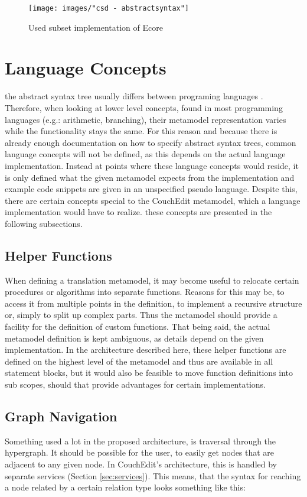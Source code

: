 \begin{figure}
\centering
\texttt{[image: images/"csd - abstractsyntax"]}
\caption{Used subset implementation of Ecore}
\label{fig:csd-abstractsyntax}
\end{figure}


\section{Language Concepts}
the abstract syntax tree usually differs between programing languages . Therefore, when looking at lower level concepts, found in most programming languages (e.g.: arithmetic, branching), their metamodel representation varies while the functionality stays the same. For this reason and because there is already enough documentation on how to specify abstract syntax trees, common language concepts will not be defined, as this depends on the actual language implementation. Instead at points where these language concepts would reside, it is only defined what the given metamodel expects from the implementation and example code snippets are given in an unspecified pseudo language. Despite this, there are certain concepts special to the CouchEdit metamodel, which a language implementation would have to realize. these concepts are presented in the following subsections.


\subsection{Helper Functions}
When defining a translation metamodel, it may become useful to relocate certain procedures or algorithms into separate functions. Reasons for this may be, to access it from multiple points in the definition, to implement a recursive structure or, simply to split up complex parts. Thus the metamodel should provide a facility for the definition of custom functions. That being said, the actual metamodel definition is kept ambiguous, as details depend on the given implementation. In the architecture described here, these helper functions are defined on the highest level of the metamodel and thus are available in all statement blocks, but it would also be feasible to move function definitions into sub scopes, should that provide advantages for certain implementations. 

\subsection{Graph Navigation}
\label{sec:abstraction}
Something used a lot in the proposed architecture, is traversal through the hypergraph. It should be possible for the user, to easily get nodes that are adjacent to any given node. In CouchEdit's architecture, this is handled by separate services (Section \ref{sec:services}). This means, that the syntax for reaching a node related by a certain relation type looks something like this: 

